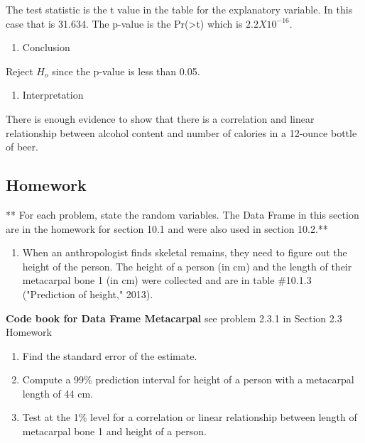 \documentclass[
]{book}
\providecommand{\tightlist}{%
  \setlength{\itemsep}{0pt}\setlength{\parskip}{0pt}}
\begin{document}
The test statistic is the t value in the table for the explanatory variable. In this case that is 31.634. The p-value is the Pr(\textgreater\textbar t\textbar) which is \(2.2X10^{-16}\).

\begin{enumerate}
\def\labelenumi{\arabic{enumi}.}
\setcounter{enumi}{4}
\tightlist
\item
  Conclusion
\end{enumerate}

Reject \(H_o\) since the p-value is less than 0.05.

\begin{enumerate}
\def\labelenumi{\arabic{enumi}.}
\setcounter{enumi}{5}
\tightlist
\item
  Interpretation
\end{enumerate}

There is enough evidence to show that there is a correlation and linear relationship between alcohol content and number of calories in a 12-ounce bottle of beer.

\hypertarget{homework-27}{%
\subsection{Homework}\label{homework-27}}

** For each problem, state the random variables. The Data Frame in this section are in the homework for section 10.1 and were also used in section 10.2.**

\begin{enumerate}
\def\labelenumi{\arabic{enumi}.}
\tightlist
\item
  When an anthropologist finds skeletal remains, they need to figure out the height of the person. The height of a person (in cm) and the length of their metacarpal bone 1 (in cm) were collected and are in table \#10.1.3 ("Prediction of height," 2013).
\end{enumerate}

\textbf{Code book for Data Frame Metacarpal} see problem 2.3.1 in Section 2.3 Homework

\begin{enumerate}
\def\labelenumi{\alph{enumi}.}
\tightlist
\item
  Find the standard error of the estimate.
\item
  Compute a 99\% prediction interval for height of a person with a metacarpal length of 44 cm.
\item
  Test at the 1\% level for a correlation or linear relationship between length of metacarpal bone 1 and height of a person.
\end{enumerate}
\end{document}
